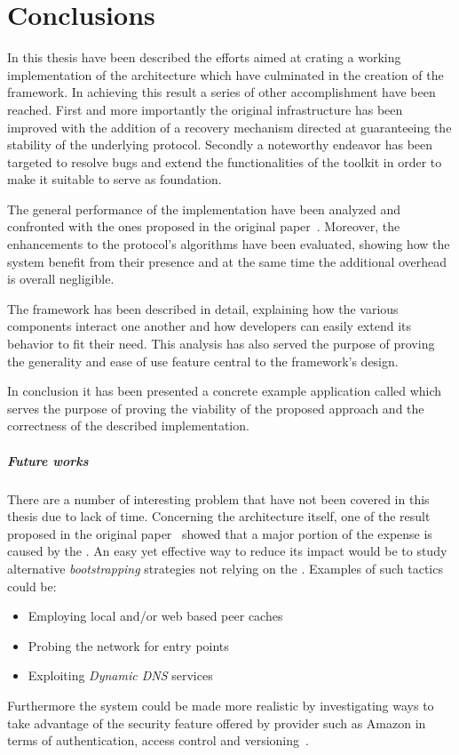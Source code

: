 \chapter{Conclusions}
In this thesis have been described the efforts aimed at crating a
working implementation of the \cloudcast architecture which have
culminated in the creation of the \cloudypeer framework. In achieving
this result a series of other accomplishment have been reached. First
and more importantly the original \cloudcast infrastructure has been
improved with the addition of a recovery mechanism directed at
guaranteeing the stability of the underlying \peersampling
protocol. Secondly a noteworthy endeavor has been targeted to resolve
bugs and extend the functionalities of the \grapes toolkit in order
to make it suitable to serve as foundation.

The general performance of the implementation have been analyzed and
confronted with the ones proposed in the original
paper~\cite{Cloudcast}. Moreover, the enhancements to the protocol's
algorithms have been evaluated, showing how the system benefit from
their presence and at the same time the additional overhead
is overall negligible.

The \cloudypeer framework has been described in detail, explaining how
the various components interact one another and how developers can
easily extend its behavior to fit their need. This analysis has also
served the purpose of proving the generality and ease of use feature
central to the framework's design.

In conclusion it has been presented a concrete example application
called \cloudyrss which serves the purpose of proving the viability of
the proposed approach and the correctness of the described
implementation.

\paragraph{Future works}
There are a number of interesting problem that have not been covered
in this thesis due to lack of time. Concerning the \cloudcast
architecture itself, one of the result proposed in the original
paper~\cite{Cloudcast} showed that a major portion of the expense is
caused by the \peersampling. An easy yet effective way to reduce its
impact would be to study alternative \textit{bootstrapping} strategies
not relying on the \cloud. Examples of such tactics could be:
\begin{itemize}
  \item Employing local and/or web based peer
    caches~\cite{GnutellaWebCache}~\cite{P2PVPN}
  \item Probing the network for entry
    points~\cite{BootstrappingP2P}~\cite{BootstrappingP2PLocality}
    ~\cite{DecentralizedBootstrappingP2P}
    \item Exploiting \textit{Dynamic DNS}
      services~\cite{DecentralizedBootstrapping}
\end{itemize}
Furthermore the system could be made more realistic by investigating
ways to take advantage of the security feature offered by \cloud
provider such as Amazon in terms of authentication, access control and
versioning~\cite{AmazonS3DevGuide}.

